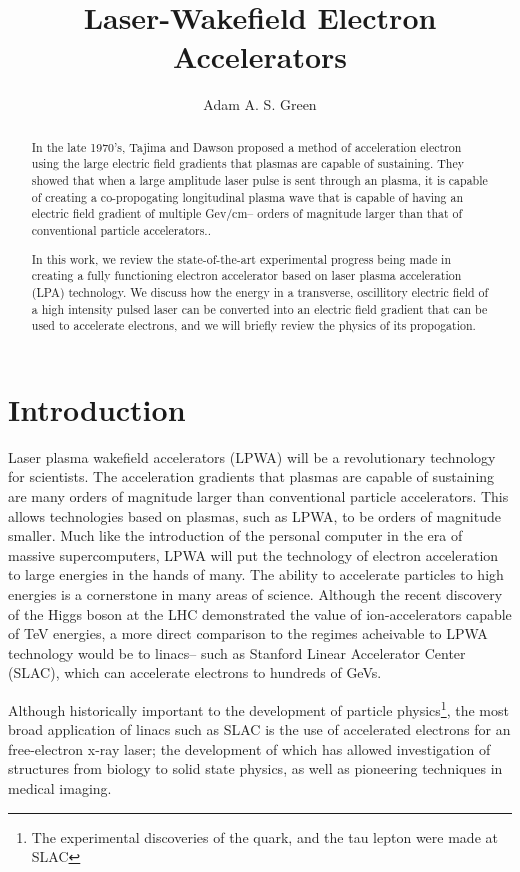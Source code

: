 \documentclass[12pt,letter]{article}
\title{Laser-Wakefield Electron Accelerators}
\author{Adam A. S. Green}
\begin{document}

\maketitle
\doublespacing
\strictpagecheck

\begin{abstract}
In the late 1970's, Tajima and Dawson proposed a method of acceleration 
electron using the large electric field gradients that plasmas are capable of 
sustaining. They showed that when a large amplitude laser pulse is sent through 
an plasma, it is capable of creating a co-propogating longitudinal plasma wave 
that is capable of having an electric field gradient of multiple Gev/cm-- orders
of magnitude larger than that of conventional particle accelerators.. 

In this work, we review the state-of-the-art experimental progress being made 
in creating a fully functioning electron accelerator based on laser plasma 
acceleration (LPA) technology. We discuss how the energy in a  transverse, 
oscillitory electric field of a high intensity pulsed laser can be converted 
into an electric field gradient that can be used to accelerate electrons, and 
we will briefly review the physics of its propogation.  \end{abstract}
\tableofcontents
\section{Introduction}
\label{sec:intro}
Laser plasma wakefield accelerators (LPWA) will be a revolutionary technology
for scientists. The acceleration gradients that plasmas are capable of
sustaining are many orders of magnitude larger than conventional particle
accelerators. This allows technologies based on plasmas, such as LPWA, to be
orders of magnitude smaller.
 Much like the introduction of the personal computer in the era of massive
 supercomputers, LPWA will put the technology of electron acceleration to
 large energies in the hands of many.
 The ability to accelerate particles to high energies is a cornerstone
 in many areas of science. Although the recent discovery of the Higgs
 boson\cite{} at the LHC demonstrated the value of ion-accelerators capable of
 TeV energies, a more direct comparison to the regimes acheivable to LPWA
 technology would be to linacs-- such as Stanford Linear Accelerator Center
 (SLAC), which can accelerate electrons to hundreds of GeVs\cite{}.

 Although historically important to the development of particle
 physics\footnote{The experimental discoveries of the quark, and the tau lepton
 were made at SLAC}, the most broad application of linacs such as SLAC is the use of
 accelerated electrons for an free-electron x-ray laser; the development of
 which has allowed investigation of structures from biology to solid state
 physics, as well as pioneering techniques in medical imaging.\cite{}
 
\end{document}
